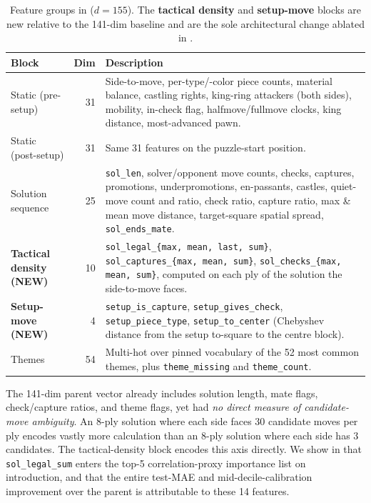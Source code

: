 \begin{table}[t]
\centering
\caption{Feature groups in \ours ($d = 155$). The \textbf{tactical density} and \textbf{setup-move} blocks are new relative to the 141-dim \parentmodel baseline and are the sole architectural change ablated in .}
\label{tab:features}
\begin{tabular}{@{}lrp{7.2cm}@{}}
\toprule
\textbf{Block} & \textbf{Dim} & \textbf{Description} \\
\midrule
Static (pre-setup) & 31 & Side-to-move, per-type/-color piece counts, material balance, castling rights, king-ring attackers (both sides), mobility, in-check flag, halfmove/fullmove clocks, king distance, most-advanced pawn. \\
Static (post-setup) & 31 & Same 31 features on the puzzle-start position. \\
Solution sequence & 25 & \texttt{sol\_len}, solver/opponent move counts, checks, captures, promotions, underpromotions, en-passants, castles, quiet-move count and ratio, check ratio, capture ratio, max \& mean move distance, target-square spatial spread, \texttt{sol\_ends\_mate}. \\
\textbf{Tactical density (NEW)} & 10 & \texttt{sol\_legal\_\{max, mean, last, sum\}}, \texttt{sol\_captures\_\{max, mean, sum\}}, \texttt{sol\_checks\_\{max, mean, sum\}}, computed on each ply of the solution the side-to-move faces. \\
\textbf{Setup-move (NEW)} & 4 & \texttt{setup\_is\_capture}, \texttt{setup\_gives\_check}, \texttt{setup\_piece\_type}, \texttt{setup\_to\_center} (Chebyshev distance from the setup to-square to the centre block). \\
Themes & 54 & Multi-hot over pinned vocabulary of the 52 most common themes, plus \texttt{theme\_missing} and \texttt{theme\_count}. \\
\bottomrule
\end{tabular}
\end{table}

The 141-dim parent vector already includes solution length, mate flags, check/capture ratios, and theme flags, yet had \emph{no direct measure of candidate-move ambiguity}. An 8-ply solution where each side faces 30 candidate moves per ply encodes vastly more calculation than an 8-ply solution where each side has 3 candidates. The tactical-density block encodes this axis directly. We show in  that \texttt{sol\_legal\_sum} enters the top-5 correlation-proxy importance list on introduction, and that the entire test-MAE and mid-decile-calibration improvement over the parent is attributable to these 14 features.

